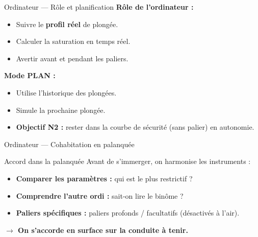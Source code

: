 \begin{frame}{Ordinateur — Rôle et planification}
    \textbf{Rôle de l'ordinateur :}
    \begin{itemize}
        \item Suivre le \textbf{profil réel} de plongée.
        \item Calculer la saturation en temps réel.
        \item Avertir avant et pendant les paliers.
    \end{itemize}

    \vspace{0.3cm}
    \textbf{Mode \og PLAN \fg{} :}
    \begin{itemize}
        \item Utilise l'historique des plongées.
        \item Simule la prochaine plongée.
        \item \textbf{Objectif N2 :} rester dans la courbe de sécurité (sans palier) en autonomie.
    \end{itemize}
\end{frame}

\begin{frame}{Ordinateur — Cohabitation en palanquée}
    \begin{block}{Accord dans la palanquée}
        Avant de s'immerger, on harmonise les instruments :
        \begin{itemize}
            \item \textbf{Comparer les paramètres :} qui est le plus restrictif ?
            \item \textbf{Comprendre l'autre ordi :} sait-on lire le binôme ?
            \item \textbf{Paliers spécifiques :} paliers profonds / facultatifs (désactivés à l'air).
        \end{itemize}
        \vspace{0.2cm}
        \textbf{$\rightarrow$ On s'accorde en surface sur la conduite à tenir.}
    \end{block}
\end{frame}


